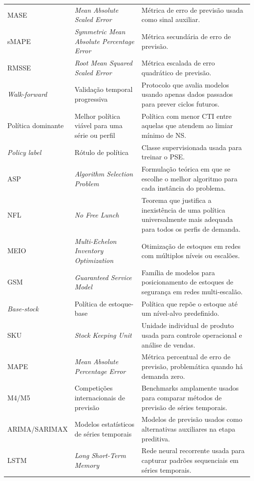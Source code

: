 \begin{longtable}{@{}>{\raggedright\arraybackslash}p{2.35cm}>{\raggedright\arraybackslash}p{5.05cm}>{\raggedright\arraybackslash}p{7.15cm}@{}}
MASE & \textit{Mean Absolute Scaled Error} & Métrica de erro de previsão usada como sinal auxiliar. \\
sMAPE & \textit{Symmetric Mean Absolute Percentage Error} & Métrica secundária de erro de previsão. \\
RMSSE & \textit{Root Mean Squared Scaled Error} & Métrica escalada de erro quadrático de previsão. \\
\textit{Walk-forward} & Validação temporal progressiva & Protocolo que avalia modelos usando apenas dados passados para prever ciclos futuros. \\
Política dominante & Melhor política viável para uma série ou perfil & Política com menor CTI entre aquelas que atendem ao limiar mínimo de NS. \\
\textit{Policy label} & Rótulo de política & Classe supervisionada usada para treinar o PSE. \\
ASP & \textit{Algorithm Selection Problem} & Formulação teórica em que se escolhe o melhor algoritmo para cada instância do problema. \\
NFL & \textit{No Free Lunch} & Teorema que justifica a inexistência de uma política universalmente mais adequada para todos os perfis de demanda. \\
MEIO & \textit{Multi-Echelon Inventory Optimization} & Otimização de estoques em redes com múltiplos níveis ou escalões. \\
GSM & \textit{Guaranteed Service Model} & Família de modelos para posicionamento de estoques de segurança em redes multi-escalão. \\
\textit{Base-stock} & Política de estoque-base & Política que repõe o estoque até um nível-alvo predefinido. \\
SKU & \textit{Stock Keeping Unit} & Unidade individual de produto usada para controle operacional e análise de vendas. \\
MAPE & \textit{Mean Absolute Percentage Error} & Métrica percentual de erro de previsão, problemática quando há demanda zero. \\
M4/M5 & Competições internacionais de previsão & Benchmarks amplamente usados para comparar métodos de previsão de séries temporais. \\
ARIMA/SARIMAX & Modelos estatísticos de séries temporais & Modelos de previsão usados como alternativas auxiliares na etapa preditiva. \\
LSTM & \textit{Long Short-Term Memory} & Rede neural recorrente usada para capturar padrões sequenciais em séries temporais. \\

\end{longtable}
